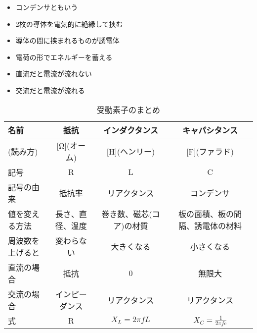 \begin{multicols}{3}
    \begin{itemize}
        \item コンデンサともいう
        \item 2枚の導体を電気的に絶縁して挟む
        \item 導体の間に挟まれるものが誘電体
        \item 電荷の形でエネルギーを蓄える
        \item 直流だと電流が流れない
        \item 交流だと電流が流れる
    \end{itemize}
\end{multicols}
\begin{table}[htbp]
    \caption{受動素子のまとめ}
    \label{tab:mem}
    \begin{center}
    \begin{tabular}{l|c|c|c} \hline
    名前&抵抗&インダクタンス&キャパシタンス\\ \hline
    [単位](読み方)&[Ω](オーム)&[H](ヘンリー)&[F](ファラド)\\ \hline
    記号&R&L&C\\ \hline
    記号の由来&抵抗率&リアクタンス&コンデンサ\\ \hline
    値を変える方法&長さ、直径、温度&巻き数、磁芯(コア)の材質&板の面積、板の間隔、誘電体の材料\\ \hline
    周波数を上げると&変わらない&大きくなる&小さくなる\\ \hline
    直流の場合&抵抗&0&無限大\\ \hline
    交流の場合&インピーダンス&リアクタンス&リアクタンス\\ \hline
    式& R &$X_L = 2\pi fL$ & $X_C = \frac{1}{2 \pi fc}$
    \end{tabular}
        \end{center}
    \here
\end{table}